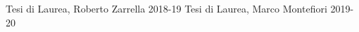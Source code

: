 \begin{frame}
   \begin{thebibliography}{9}
   \small

       Tesi di Laurea, Roberto Zarrella 2018-19
       Tesi di Laurea, Marco Montefiori 2019-20
   \end{thebibliography}
\end{frame}